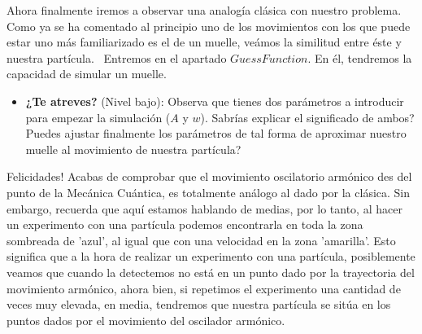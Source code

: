 Ahora finalmente iremos a observar una analog\'ia cl\'asica con nuestro problema. Como ya se ha comentado al principio uno de los movimientos con los que puede estar uno m\'as familiarizado es el de un muelle, ve\'amos la similitud entre \'este y nuestra part\'icula.
\
Entremos en el apartado $Guess Function$. En \'el, tendremos la capacidad de simular un muelle.

\begin{itemize}
	\item \textbf{¿Te atreves?} (Nivel bajo): Observa que tienes dos par\'ametros a introducir para empezar la simulaci\'on ($A$ y $w$). Sabr\'ias explicar el significado de ambos? Puedes ajustar finalmente los par\'ametros de tal forma de aproximar nuestro muelle al movimiento de nuestra part\'icula?
\end{itemize}

Felicidades! Acabas de comprobar que el movimiento oscilatorio arm\'onico des del punto de la Mec\'anica Cu\'antica, es totalmente an\'alogo al dado por la cl\'asica. Sin embargo, recuerda que aqu\'i estamos hablando de medias, por lo tanto, al hacer un experimento con una part\'icula podemos encontrarla en toda la zona sombreada de 'azul', al igual que con una velocidad en la zona 'amarilla'. Esto significa que a la hora de realizar un experimento con una part\'icula, posiblemente veamos que cuando la detectemos no est\'a en un punto dado por la trayectoria del movimiento arm\'onico, ahora bien, si repetimos el experimento una cantidad de veces muy elevada, en media, tendremos que nuestra part\'icula se sit\'ua en los puntos dados por el movimiento del oscilador arm\'onico.
